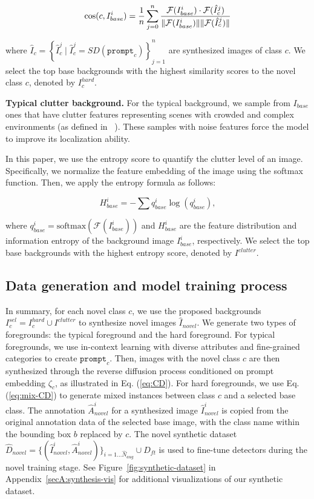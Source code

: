 \begin{equation}
\label{eq:hard-bg}
    \cos(c, I_{base}^i) = \frac{1}{n}  \sum_{j=0}^n {  \mathcal{F}(I_{base}^i) \cdot \mathcal{F}(\hat{I}^j_{c})\over \| \mathcal{F}(I_{base}^i) \|\| \mathcal{F}(\hat{I}^j_{c}) \|}
\end{equation}

where $\hat{I}_{c} =\left\{\hat{I}_{c}^{j} \mid \hat{I}_{c}^{j}= SD(\texttt{prompt}_c) \right\}_{j=1}^n$ are synthesized images of class $c$. We select the top base backgrounds with the highest similarity scores to the novel class $c$, denoted by $I_{c}^{hard}$.


\textbf{Typical clutter background.} For the typical background, we sample  from $I_{base}$ ones that have clutter features representing scenes with crowded and complex environments (as defined in ~\cite{rosenholtz2007measuring}). 
These samples with noise features force the model to improve its localization ability.

In this paper, we use the entropy score to quantify the clutter level of an image. Specifically, we normalize the feature embedding of the image using the softmax function. Then, we apply the entropy formula as follows:

\begin{equation}
   H_{base}^i = -\sum q_{base}^i\log (q_{base}^i),
\end{equation}

where $q_{base}^i=\text{softmax}(\mathcal{F}(I_{base}^i))$ and $H_{base}^i$ are the feature distribution and information entropy of the background image $I_{base}^i$, respectively. We select the top base backgrounds with the highest entropy score, denoted by $I^{clutter}$.

\subsection{Data generation and model training process}

In summary, for each novel class $c$, we use the proposed backgrounds $I_{c}^{sel} = I_{c}^{hard} \cup I^{clutter}$ to synthesize novel images $\hat{I}_{novel}$. We generate two types of foregrounds: the typical foreground and the hard foreground. For typical foregrounds, we use in-context learning with diverse attributes and fine-grained categories to create $\texttt{prompt}_c$. Then, images with the novel class $c$ are then synthesized through the reverse diffusion process conditioned on prompt embedding $\zeta_c$, as illustrated in Eq.  (\ref{eq:CD}). For hard foregrounds, we use Eq. (\ref{eq:mix-CD}) to generate mixed instances between class $c$ and a selected base class. The annotation $\hat{A}_{novel}^i$ for a synthesized image $\hat{I}_{novel}^i$ is copied from the original annotation data of the selected base image, with the class name within the bounding box $b$ replaced by $c$. The novel synthetic dataset $\hat{D}_{novel} = \{(\hat{I}_{novel}^i, \hat{A}_{novel}^i)\}_{i=1\ldots \hat{N}_{aug}} \cup D_{ft}$ is used to fine-tune detectors during the novel training stage. See Figure~\ref{fig:synthetic-dataset}  in Appendix~\ref{secA:synthesis-vis} for additional visualizations of our synthetic dataset.

